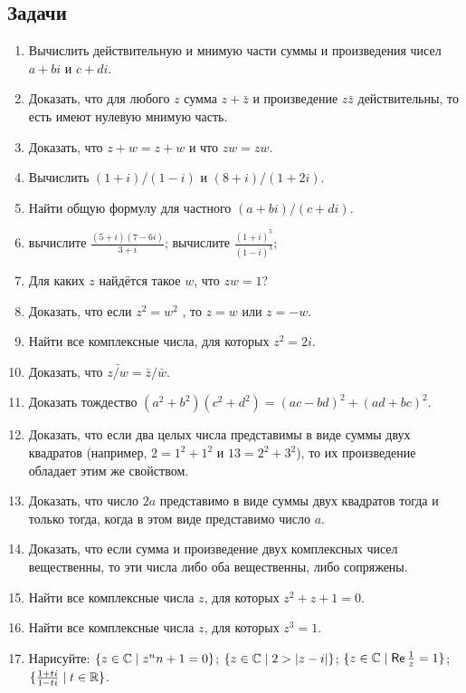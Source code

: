 
\subsection*{Задачи}

\begin{enumerate}
\item Вычислить действительную и мнимую части суммы и произведения чисел $a + bi$ и $c + di$.
\item Доказать, что для любого $z$ сумма $z + \bar z$ и произведение $z\bar z$ действительны, то есть имеют нулевую мнимую часть.
\item Доказать, что $z + w = z + w$ и что $z w = z w$.
\item Вычислить $(1 + i)/(1 - i)$ и $(8 + i)/(1 + 2i)$.
\item Найти общую формулу для частного $(a + bi)/(c + di)$.
\item 
 \ipunkt  вычислите $\frac{(5+i)(7-6i)}{3+i}$;
 \ipunkt  вычислите $\frac{(1+i)^5}{(1-i)^3}$;
\item Для каких $z$ найдётся такое $w$, что $zw = 1$?
\item Доказать, что если $z^2 = w^2$ , то $z = w$ или $z = -w$.
\item Найти все комплексные числа, для которых $z^2 = 2i$.
\item Доказать, что $\bar{z/w} = \bar z/\bar w$.
\item Доказать тождество $(a^2 +b^2 )(c^2 +d^2) = (ac-bd)^2 +(ad+bc)^2$.
\item Доказать, что если два целых числа представимы в виде
суммы двух квадратов (например, $2 = 1^2 + 1^2$ и $13 = 2^2 + 3^2$), то их
произведение обладает этим же свойством.
\item Доказать, что число $2a$ представимо в виде суммы двух
квадратов тогда и только тогда, когда в этом виде представимо
число $a$.
\item Доказать, что если сумма и произведение двух комплексных чисел вещественны,
 то эти числа либо оба вещественны, либо сопряжены.
\item Найти все комплексные числа $z$, для которых $z^2 + z + 1 = 0$.
\item Найти все комплексные числа $z$, для которых $z^3 = 1$.
\item  Нарисуйте: \ipunkt  $\{z \in \mathbb C \mid z^nn + 1 = 0\}$; \ipunkt  $\{z \in \mathbb C \mid 2 > |z - i|\}$; \ipunkt  $\{z \in \mathbb C \mid \mathop{\textsf{Re}} \frac{1}{z} = 1\}$; \ipunkt  $\{ \frac{1+ti}{1-ti} \mid t \in \mathbb R\}$.

\end{enumerate}





